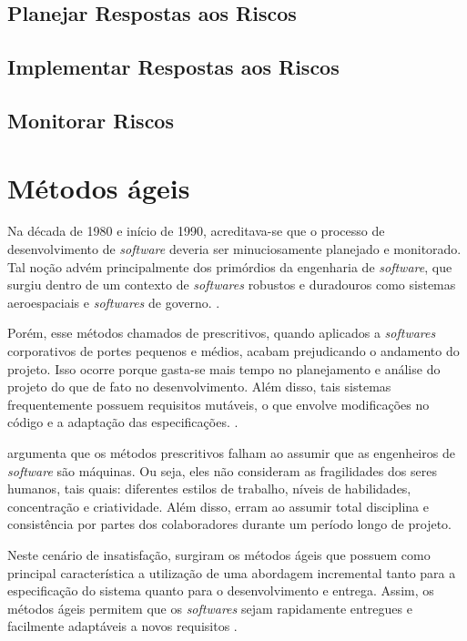 \documentclass[
    12pt,       %
    openright,      %
    twoside,      %
    a4paper,      %
    english,      %
    french,       %
    spanish,      %
    brazil,       %
    ]{abntex2}
\begin{document}
\subsection{Planejar Respostas aos Riscos}
\subsection{Implementar Respostas aos Riscos}
\subsection{Monitorar Riscos}

\section{Métodos ágeis}

Na década de 1980 e início de 1990, acreditava-se que o processo de desenvolvimento de \textit{software} deveria ser minuciosamente planejado e monitorado. Tal noção advém principalmente dos primórdios da engenharia de \textit{software}, que surgiu dentro de um contexto de \textit{softwares} robustos e duradouros como sistemas aeroespaciais e \textit{softwares} de governo. \cite{SOMMERVILLE:2011}.

Porém, esse métodos chamados de prescritivos, quando aplicados a \textit{softwares} corporativos de portes pequenos e médios, acabam prejudicando o andamento do projeto. Isso ocorre porque gasta-se mais tempo no planejamento e análise do projeto do que de fato no desenvolvimento. Além disso, tais sistemas frequentemente possuem requisitos mutáveis, o que envolve modificações no código e a adaptação das especificações. \cite{SOMMERVILLE:2011}.

 argumenta que os métodos prescritivos falham ao assumir que as engenheiros de \textit{software} são máquinas. Ou seja, eles não consideram as fragilidades dos seres humanos, tais quais: diferentes estilos de trabalho, níveis de habilidades, concentração e criatividade. Além disso, erram ao assumir total disciplina e consistência por partes dos colaboradores durante um período longo de projeto.

Neste cenário de insatisfação, surgiram os métodos ágeis que possuem como principal característica a utilização de uma abordagem incremental tanto para a especificação do sistema quanto para o desenvolvimento e entrega. Assim, os métodos ágeis permitem que os \textit{softwares} sejam rapidamente entregues e facilmente adaptáveis a novos requisitos \cite{SOMMERVILLE:2011}.
\end{document}
